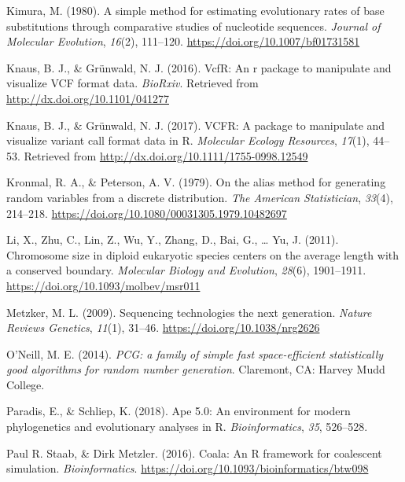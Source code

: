 \documentclass[12pt,]{article}
\begin{document}
\leavevmode\hypertarget{ref-Kimura_1980}{}%
Kimura, M. (1980). A simple method for estimating evolutionary rates of
base substitutions through comparative studies of nucleotide sequences.
\emph{Journal of Molecular Evolution}, \emph{16}(2), 111--120.
\url{https://doi.org/10.1007/bf01731581}

\leavevmode\hypertarget{ref-Knaus_2016}{}%
Knaus, B. J., \& Grünwald, N. J. (2016). VcfR: An r package to
manipulate and visualize VCF format data. \emph{BioRxiv}. Retrieved from
\url{http://dx.doi.org/10.1101/041277}

\leavevmode\hypertarget{ref-Knaus_2017}{}%
Knaus, B. J., \& Grünwald, N. J. (2017). VCFR: A package to manipulate
and visualize variant call format data in R. \emph{Molecular Ecology
Resources}, \emph{17}(1), 44--53. Retrieved from
\url{http://dx.doi.org/10.1111/1755-0998.12549}

\leavevmode\hypertarget{ref-Kronmal_1979}{}%
Kronmal, R. A., \& Peterson, A. V. (1979). On the alias method for
generating random variables from a discrete distribution. \emph{The
American Statistician}, \emph{33}(4), 214--218.
\url{https://doi.org/10.1080/00031305.1979.10482697}

\leavevmode\hypertarget{ref-Li_2011}{}%
Li, X., Zhu, C., Lin, Z., Wu, Y., Zhang, D., Bai, G., \ldots{} Yu, J.
(2011). Chromosome size in diploid eukaryotic species centers on the
average length with a conserved boundary. \emph{Molecular Biology and
Evolution}, \emph{28}(6), 1901--1911.
\url{https://doi.org/10.1093/molbev/msr011}

\leavevmode\hypertarget{ref-Metzker_2009}{}%
Metzker, M. L. (2009). Sequencing technologies the next generation.
\emph{Nature Reviews Genetics}, \emph{11}(1), 31--46.
\url{https://doi.org/10.1038/nrg2626}

\leavevmode\hypertarget{ref-Oneill_2014pcg}{}%
O'Neill, M. E. (2014). \emph{PCG: a family of simple fast
space-efficient statistically good algorithms for random number
generation}. Claremont, CA: Harvey Mudd College.

\leavevmode\hypertarget{ref-Paradis_2018}{}%
Paradis, E., \& Schliep, K. (2018). Ape 5.0: An environment for modern
phylogenetics and evolutionary analyses in R. \emph{Bioinformatics},
\emph{35}, 526--528.

\leavevmode\hypertarget{ref-Paul_R._Staab_2016}{}%
Paul R. Staab, \& Dirk Metzler. (2016). Coala: An R framework for
coalescent simulation. \emph{Bioinformatics}.
\url{https://doi.org/10.1093/bioinformatics/btw098}
\end{document}
